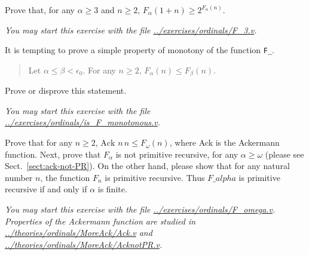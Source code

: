 
\begin{exercise}
Prove that, for any $\alpha\geq 3$ and $n\geq 2$,
$F_\alpha(1+n)\geq 2^{F_\alpha(n)}$.



\emph{You may start this exercise with the file
\url{../exercises/ordinals/F_3.v}.}
\end{exercise}



\begin{exercise}
It is tempting to prove a simple property of monotony 
of the function \texttt{F\_}.

\begin{quote}
   Let $\alpha\leq\beta<\epsilon_0$. For any $n\geq 2$,
$F_\alpha(n)\leq F_\beta(n)$. 
\end{quote}
Prove or disprove this statement.

\emph{You may start this exercise with the file
\url{../exercises/ordinals/is_F_monotonous.v}.}
\end{exercise}

\begin{exercise}



Prove that for any $n\geq 2$, $\textrm{Ack}\,\,n\,n\leq  F_\omega(n)$, where \textrm{Ack} is the Ackermann function. Next, prove that $F_\alpha$ is not primitive recursive, for any $\alpha\geq\omega$  (please see Sect.~\vref{sect:ack-not-PR}).
On the other hand, please show that for any natural number $n$, the function $F_n$ is primitive recursive.
Thus $F\_alpha$ is primitive recursive if and only if $\alpha$ is finite.

\emph{You may start this exercise with the file
\url{../exercises/ordinals/F_omega.v}. Properties of the Ackermann function are studied in 
\url{../theories/ordinals/MoreAck/Ack.v} and
\url{../theories/ordinals/MoreAck/AcknotPR.v}.}
\end{exercise} 

